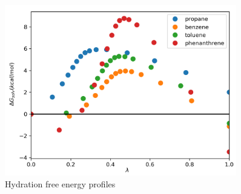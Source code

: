 \begin{figure}
\centering
\includegraphics[width=0.9\textwidth]{Figures/water}
\caption{Hydration free energy profiles}
\label{fig:water}
\end{figure}

